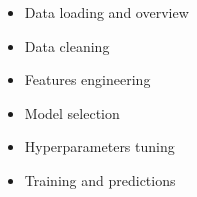 


\begin{itemize}
	\item Data loading and overview
	\item Data cleaning
	\item Features engineering
	\item Model selection
	\item Hyperparameters tuning
	\item Training and predictions
\end{itemize}





